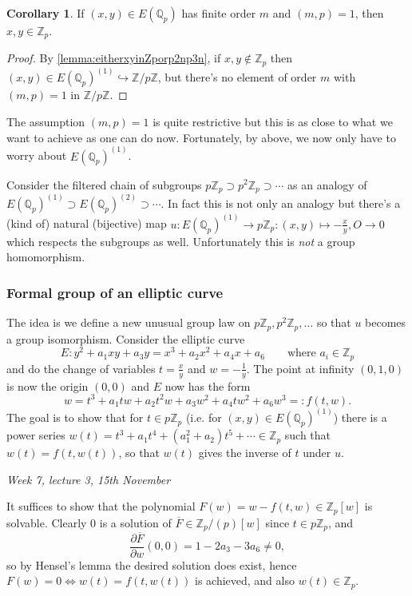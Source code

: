 \documentclass{article}
\newcommand{\Z}{\mathbb{Z}}
\newcommand{\Q}{\mathbb{Q}}
\theoremstyle{definition}
\newtheorem{coro}[defn]{Corollary}
\begin{document}
\begin{coro}
\label{coro:almostNagell}
If $(x,y)\in E(\Q_p)$ has finite order $m$ and $(m,p)=1$, then $x,y\in\Z_p$.
\end{coro}
\begin{proof}
By \ref{lemma:eitherxyinZporp2np3n}, if $x,y\notin\Z_p$ then $(x,y)\in E(\Q_p)^{(1)}\hookrightarrow\Z/p\Z$, but there's no element of order $m$ with $(m,p)=1$ in $\Z/p\Z$.
\end{proof}

The assumption $(m,p)=1$ is quite restrictive but this is as close to what we want to achieve as one can do now. Fortunately, by above, we now only have to worry about $E(\Q_p)^{(1)}$.

Consider the filtered chain of subgroups $p\Z_p\supset p^2\Z_p\supset\cdots$ as an analogy of $E(\Q_p)^{(1)}\supset E(\Q_p)^{(2)}\supset\cdots$. In fact this is not only an analogy but there's a (kind of) natural (bijective) map $u:E(\Q_p)^{(1)}\rightarrow p\Z_p:(x,y)\mapsto -\frac{x}{y},O\rightarrow 0$ which respects the subgroups as well. Unfortunately this is \textit{not} a group homomorphism.

\subsubsection{Formal group of an elliptic curve}
The idea is we define a new unusual group law on $p\Z_p,p^2\Z_p,\ldots$ so that $u$ becomes a group isomorphism. Consider the elliptic curve
\[
E:y^2+a_1xy+a_3y=x^3+a_2x^2+a_4x+a_6\qquad\text{where }a_i\in\Z_p
\]
and do the change of variables $t=\frac{x}{y}$ and $w=-\frac1y$. The point at infinity $(0,1,0)$ is now the origin $(0,0)$ and $E$ now has the form
\[
w=t^3+a_1tw+a_2t^2w+a_3w^2+a_4tw^2+a_6w^3=:f(t,w).
\]
The goal is to show that for $t\in p\Z_p$ (i.e. for $(x,y)\in E(\Q_p)^{(1)}$) there is a power series $w(t)=t^3+a_1t^4+(a_1^2+a_2)t^5+\cdots\in\Z_p$ such that $w(t)=f(t,w(t))$, so that $w(t)$ gives the inverse of $t$ under $u$.

\begin{flushright}
\textit{Week 7, lecture 3, 15th November}
\end{flushright}

It suffices to show that the polynomial $F(w)=w-f(t,w)\in\Z_p[w]$ is solvable. Clearly 0 is a solution of $\overline F\in\Z_p/(p)[w]$ since $t\in p\Z_p$, and
\[
\frac{\partial \overline F}{\partial w}(0,0)=1-2a_3-3a_6\neq 0,
\]
so by Hensel's lemma the desired solution does exist, hence $F(w)=0\iff w(t)=f(t,w(t))$ is achieved, and also $w(t)\in\Z_p$.
\end{document}
